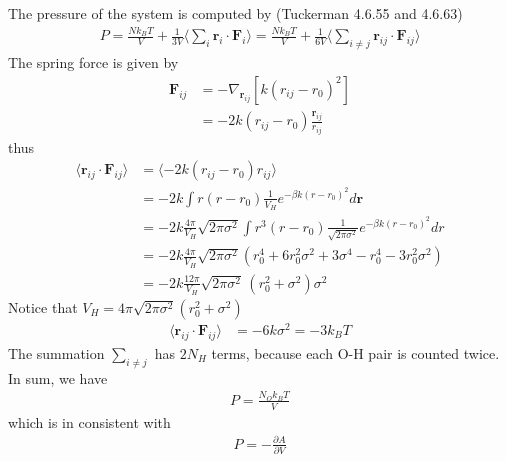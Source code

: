 \documentclass[aps,pre,a4paper,showkeys,fleqn]{revtex4}
\begin{document}
The pressure of the system is computed by (Tuckerman 4.6.55 and 4.6.63)
\begin{align*}
  P
  = \frac{Nk_BT}{V} +
  \frac{1}{3V}
  \Big\langle
  \sum_i \bm r_i\cdot\bm F_i
  \Big\rangle
  = \frac{Nk_BT}{V} +
  \frac{1}{6V}
  \Big\langle
  \sum_{i\neq j} \bm r_{ij}\cdot\bm F_{ij}
  \Big\rangle
\end{align*}
The spring force is given by
\begin{align*}
  \bm F_{ij}
  &=
    -\nabla_{\bm r_{ij}} [k (r_{ij} - r_0)^2] \\
  &=
    -2k(r_{ij} - r_0) \frac{\bm r_{ij}}{r_{ij}}
\end{align*}
thus
\begin{align*}
  \langle \bm r_{ij}\cdot\bm F_{ij} \rangle
  &=
    \langle -2k(r_{ij} - r_0)r_{ij} \rangle \\
  &=
    -2k \int r(r - r_0) \frac{1}{V_H} e^{-\beta k(r - r_0)^2} d\bm r \\
  &=
    -2k \frac{4\pi}{V_H} \sqrt{2\pi\sigma^2} \int r^3(r - r_0)\frac{1}{\sqrt{2\pi\sigma^2}} e^{-\beta k(r - r_0)^2} dr\\
  &=
    -2k \frac{4\pi}{V_H} \sqrt{2\pi\sigma^2} (r_0^4 + 6 r_0^2\sigma^2 + 3 \sigma^4 - r_0^4 - 3r_0^2\sigma^2 )\\
  &=
    -2k \frac{12\pi}{V_H} \sqrt{2\pi\sigma^2} \, ( r_0^2 + \sigma^2)\sigma^2
\end{align*}
Notice that $V_H = 4\pi\sqrt{2\pi\sigma^2} (r_0^2 + \sigma^2)$
\begin{align*}
  \langle \bm r_{ij}\cdot\bm F_{ij} \rangle
  &= -6k \sigma^2 = -3 k_BT
\end{align*}
The summation $\sum_{i\neq j}$ has $2N_H$ terms, because each O-H pair is counted twice.
In sum, we have
\begin{align*}
  P = \frac{N_O k_BT}{V}
\end{align*}
which is in consistent with
\begin{align*}
  P = -\frac{\partial A}{\partial V}
\end{align*}

{}

\end{document}

